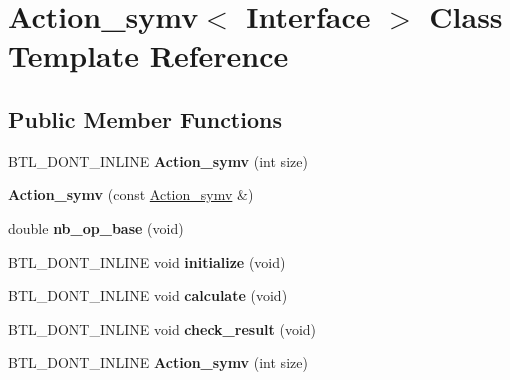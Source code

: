 \hypertarget{class_action__symv}{}\section{Action\+\_\+symv$<$ Interface $>$ Class Template Reference}
\label{class_action__symv}
\subsection*{Public Member Functions}
\begin{DoxyCompactItemize}
\item 
\mbox{\label{class_action__symv_a7d56f76d451ab8c6c6ae3bd3c26900fb}} 
B\+T\+L\+\_\+\+D\+O\+N\+T\+\_\+\+I\+N\+L\+I\+NE {\bfseries Action\+\_\+symv} (int size)
\item 
\mbox{\label{class_action__symv_a6fa6ae7d63d6812f8fa6a27fba519782}} 
{\bfseries Action\+\_\+symv} (const \hyperlink{class_action__symv}{Action\+\_\+symv} \&)
\item 
\mbox{\label{class_action__symv_a1338fbe1a2fcadf9df795709a19faf86}} 
double {\bfseries nb\+\_\+op\+\_\+base} (void)
\item 
\mbox{\label{class_action__symv_ad61375d8750436da5122c48559cd369c}} 
B\+T\+L\+\_\+\+D\+O\+N\+T\+\_\+\+I\+N\+L\+I\+NE void {\bfseries initialize} (void)
\item 
\mbox{\label{class_action__symv_a1125303ff8722640da4b2487891b28e9}} 
B\+T\+L\+\_\+\+D\+O\+N\+T\+\_\+\+I\+N\+L\+I\+NE void {\bfseries calculate} (void)
\item 
\mbox{\label{class_action__symv_a3859829cfce5b52f7fd1e7bb4085bb98}} 
B\+T\+L\+\_\+\+D\+O\+N\+T\+\_\+\+I\+N\+L\+I\+NE void {\bfseries check\+\_\+result} (void)
\item 
\mbox{\label{class_action__symv_a7d56f76d451ab8c6c6ae3bd3c26900fb}} 
B\+T\+L\+\_\+\+D\+O\+N\+T\+\_\+\+I\+N\+L\+I\+NE {\bfseries Action\+\_\+symv} (int size)
\item 
\mbox{\label{class_action__symv_a6fa6ae7d63d6812f8fa6a27fba519782}} 

\end{DoxyCompactItemize}
